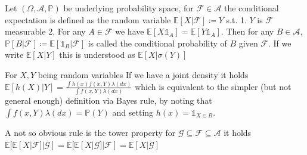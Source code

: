 Let \( (\Omega, \mathcal{A}, \mathbb{P}) \) be underlying probability space, for \( \mathcal{F} \in \mathcal{A} \)
the conditional expectation is defined as the random variable \(\mathbb{E}[X|\mathcal{F}] \coloneqq Y \)
s.t.
1. \( Y \) is \( \mathcal{F} \) measurable
2. For any \( A \in \mathcal{F}\) we have \( \mathbb{E}[X\mathbb{1}_{A}] = \mathbb{E}[Y\mathbb{1}_{A}] \).
Then for any \( B \in \mathcal{A} \), \( \mathbb{P}[B|\mathcal{F}] \coloneqq \mathbb{E}[\mathbb{1}_{B}|\mathcal{F}] \)
is called the conditional probability of \( B \) given \( \mathcal{F} \).
If we write \( \mathbb{E}[X|Y] \) this is understood as \( \mathbb{E}[X|\sigma(Y)] \)

For \( X, Y \) being random variables 
If we have a joint density it holds \( \mathbb{E}[h(X)|Y] = \frac{\int h(x)f(x,Y)\lambda(dx)}{\int f(x,Y)\lambda(dx)} \)
which is equivalent to the simpler (but not general enough) definition via Bayes rule, by noting that \( \int f(x, Y)\lambda(dx) = \mathbb{P}(Y) \)
and setting \( h(x) = \mathbb{1}_{X \in B} \).

A not so obvious rule is the tower property for \( \mathcal{G} \subseteq \mathcal{F} \subseteq \mathcal{A} \)
it holds
\( \mathbb{E}[\mathbb{E}[X|\mathcal{F}]|\mathcal{G}] =  \mathbb{E}[\mathbb{E}[X|\mathcal{G}]|\mathcal{F}] = \mathbb{E}[X|\mathcal{G}] \)
